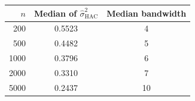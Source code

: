 \begin{tabular}{rcc}
\toprule
$n$ & Median of $\hat\sigma^2_{\mathrm{HAC}}$ & Median bandwidth \\
\midrule
200 & 0.5523 & 4 \\
500 & 0.4482 & 5 \\
1000 & 0.3796 & 6 \\
2000 & 0.3310 & 7 \\
5000 & 0.2437 & 10 \\
\bottomrule
\end{tabular}
